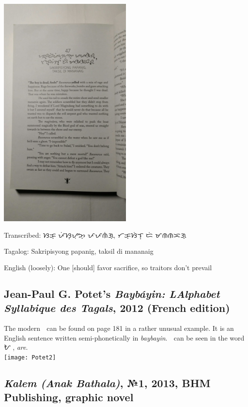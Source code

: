 \documentclass[a4paper,pagesize,openany,14pt,parskip=never]{scrbook}
\newcommand{\≈}{$\approx$}
\begin{document}
\includegraphics[width=0.5\textwidth]{7thMoon}

Transcribed: {\baybayin ᜐᜃ᜔ᜍᜒᜉᜒᜐ᜔ᜌᜓᜅ᜔ ᜉᜉᜈᜒᜄ᜔}, {\baybayin ᜆᜃ᜔ᜐᜒᜎ᜔ ᜇᜒ ᜋᜈᜈᜁᜄ᜔}

Tagalog: Sakripisyong papanig, taksil di mananaig

English (loosely): One [should] favor sacrifice, so traitors don't prevail

\subsection{Jean-Paul G. Potet's {\em Bayb\'ayin: L\textquotesingle Alphabet Syllabique des Tagals}, 2012 (French edition)}

The modern {\baybayin ᜍ} can be found on page {181} in a rather unusual example. It is an English sentence written semi-phonetically in {\em baybayin}. {\baybayin ᜍ} can be seen in the word {\baybayin ᜀᜍᜒ}, {\em are}.
 \\
\texttt{[image: Potet2]}

\subsection{{\em Kalem (Anak Bathala)}, №1, 2013, BHM Publishing, graphic novel}
\label{Kalem}
\end{document}
